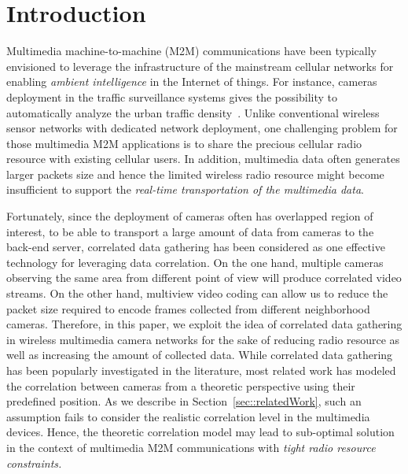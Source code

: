 \section{Introduction}
\label{sec::introduction}

Multimedia machine-to-machine (M2M) communications have been typically envisioned to
leverage the infrastructure of the mainstream cellular networks for enabling
{\em ambient intelligence} in the Internet of things.
For instance, cameras deployment in the traffic surveillance systems gives the
possibility to automatically analyze the urban traffic density~\cite{Kapsch,Traficon,Citilog}.
%
Unlike conventional wireless sensor networks with dedicated network deployment,
one challenging problem for those multimedia M2M applications is to share the
precious cellular radio resource with existing cellular users.
%
In addition, multimedia data often generates larger packets size and hence the
limited wireless radio resource might become insufficient to support the
{\em real-time transportation of the multimedia data}.

Fortunately, since the deployment of cameras often has overlapped region of interest, to
be able to transport a large amount of data from cameras to the back-end server,
correlated data gathering has been considered as one effective technology for leveraging
data correlation.
On the one hand, multiple cameras observing the same area from different point of view
will produce correlated video streams. 
On the other hand, multiview video coding can allow us to reduce the packet size
required to encode frames collected from different neighborhood cameras.
Therefore, in this paper, we exploit the idea of correlated data gathering in wireless
multimedia camera networks for the sake of reducing radio resource as well as increasing
the amount of collected data.
%
While correlated data gathering has been popularly investigated in the literature, most
related work has modeled the correlation between cameras from a theoretic perspective
using their predefined position.
As we describe in Section~\ref{sec::relatedWork}, such an assumption fails to consider
the realistic correlation level in the multimedia devices.
Hence, the theoretic correlation model may lead to sub-optimal solution in the context
of multimedia M2M communications with {\em tight radio resource constraints.}

